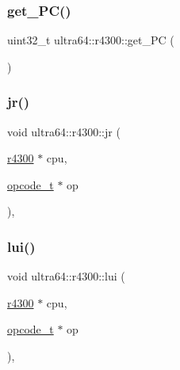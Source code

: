 \subsubsection{\texorpdfstring{get\+\_\+\+P\+C()}{get\_PC()}}
{\footnotesize\ttfamily uint32\+\_\+t ultra64\+::r4300\+::get\+\_\+\+PC (\begin{DoxyParamCaption}{ }\end{DoxyParamCaption})}

\mbox{\label{classultra64_1_1r4300_ab3f62c08f1214444ba533ba060f97158}} 
\subsubsection{\texorpdfstring{jr()}{jr()}}
{\footnotesize\ttfamily void ultra64\+::r4300\+::jr (\begin{DoxyParamCaption}\item[{\hyperlink{classultra64_1_1r4300}{r4300} $\ast$}]{cpu,  }\item[{\hyperlink{classultra64_1_1opcode__t}{opcode\+\_\+t} $\ast$}]{op }\end{DoxyParamCaption})\hspace{0.3cm}{\ttfamily [static]}, {\ttfamily [private]}}

\mbox{\label{classultra64_1_1r4300_a19756cc385281c4ac11bc65bb296b839}} 
\subsubsection{\texorpdfstring{lui()}{lui()}}
{\footnotesize\ttfamily void ultra64\+::r4300\+::lui (\begin{DoxyParamCaption}\item[{\hyperlink{classultra64_1_1r4300}{r4300} $\ast$}]{cpu,  }\item[{\hyperlink{classultra64_1_1opcode__t}{opcode\+\_\+t} $\ast$}]{op }\end{DoxyParamCaption})\hspace{0.3cm}{\ttfamily [static]}, {\ttfamily [private]}}

\mbox{\label{classultra64_1_1r4300_ab086cc9e855063b56cd32b7e373aacb4}} 
